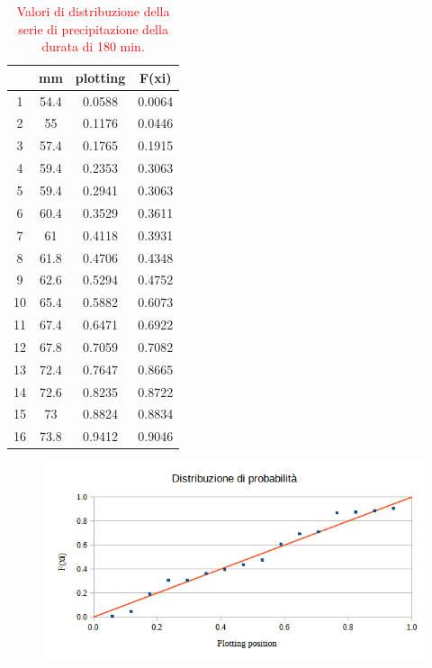 \begin{table}[H] \centering
    \caption{\textcolor{red}{Valori di distribuzione della serie di precipitazione della durata di 180 min.}}
            \begin{tabular}{cccc}
            \toprule
               & mm   & plotting & F(xi)  \\
            \midrule
            1  & 54.4 & 0.0588   & 0.0064 \\
            2  & 55   & 0.1176   & 0.0446 \\
            3  & 57.4 & 0.1765   & 0.1915 \\
            4  & 59.4 & 0.2353   & 0.3063 \\
            5  & 59.4 & 0.2941   & 0.3063 \\
            6  & 60.4 & 0.3529   & 0.3611 \\
            7  & 61   & 0.4118   & 0.3931 \\
            8  & 61.8 & 0.4706   & 0.4348 \\
            9  & 62.6 & 0.5294   & 0.4752 \\
            10 & 65.4 & 0.5882   & 0.6073 \\
            11 & 67.4 & 0.6471   & 0.6922 \\
            12 & 67.8 & 0.7059   & 0.7082 \\
            13 & 72.4 & 0.7647   & 0.8665 \\
            14 & 72.6 & 0.8235   & 0.8722 \\
            15 & 73   & 0.8824   & 0.8834 \\
            16 & 73.8 & 0.9412   & 0.9046 \\
            \bottomrule
            \end{tabular}
\end{table}

\begin{figure}[H]\centering
    \includegraphics[scale=0.75]{immagini/distr_prob_180min.png}
\end{figure}

